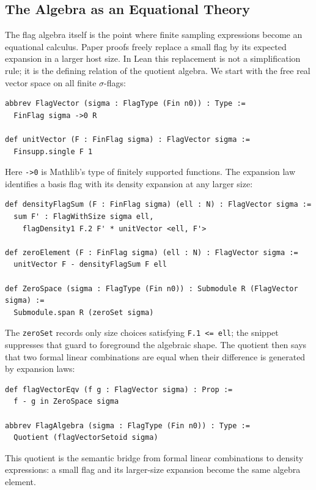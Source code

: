 \documentclass{article}
\newcommand{\lean}[1]{\texttt{#1}}
\begin{document}
\subsection{The Algebra as an Equational Theory}

The flag algebra itself is the point where finite sampling expressions become
an equational calculus.  Paper proofs freely replace a small flag by its
expected expansion in a larger host size.  In Lean this replacement is not a
simplification rule; it is the defining relation of the quotient algebra.  We
start with the free real vector space on all finite $\sigma$-flags:
\begin{lstlisting}
abbrev FlagVector (sigma : FlagType (Fin n0)) : Type :=
  FinFlag sigma ->0 R

def unitVector (F : FinFlag sigma) : FlagVector sigma :=
  Finsupp.single F 1
\end{lstlisting}
Here \lean{->0} is Mathlib's type of finitely supported functions.  The
expansion law identifies a basis flag with its density expansion at any larger
size:
\begin{lstlisting}
def densityFlagSum (F : FinFlag sigma) (ell : N) : FlagVector sigma :=
  sum F' : FlagWithSize sigma ell,
    flagDensity1 F.2 F' * unitVector <ell, F'>

def zeroElement (F : FinFlag sigma) (ell : N) : FlagVector sigma :=
  unitVector F - densityFlagSum F ell

def ZeroSpace (sigma : FlagType (Fin n0)) : Submodule R (FlagVector sigma) :=
  Submodule.span R (zeroSet sigma)
\end{lstlisting}
The \lean{zeroSet} records only size choices satisfying \lean{F.1 <= ell}; the
snippet suppresses that guard to foreground the algebraic shape.  The quotient
then says that two formal linear combinations are equal when their difference
is generated by expansion laws:
\begin{lstlisting}
def flagVectorEqv (f g : FlagVector sigma) : Prop :=
  f - g in ZeroSpace sigma

abbrev FlagAlgebra (sigma : FlagType (Fin n0)) : Type :=
  Quotient (flagVectorSetoid sigma)
\end{lstlisting}
This quotient is the semantic bridge from formal linear combinations to
density expressions: a small flag and its larger-size expansion become the
same algebra element.
\end{document}
